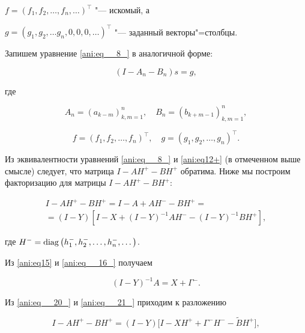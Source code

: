 $f=(f_{1} ,  f_{2} ,  \dots, f_{n} , \dots )^{\top} $ "--- искомый, а 

$g=(g_{1} ,  g_{2} ,  \dots g_{n} ,  0, 0,  0, \dots )^{\top} $ "--- заданный векторы"=столбцы.



Запишем уравнение \eqref{ani:eq__8_} в аналогичной форме:

\begin{equation}\label{ani:eq__19_}

\left({I} -A_{n} -B_{n} \right)s=g,

\end{equation}

где 

$$A_{n} =\left(a_{k-m} \right)_{k,m=1}^{n} ,\quad B_{n} =\left(b_{k+m-1} \right)_{k,m=1}^{n} ,$$ 

$$f=\left(f_{1} , f_{2} , \dots, f_{n} \right)^{\top} ,\quad  

g= (g_{1} ,  g_{2} ,  \dots, g_{n} )^{\top} .$$ 

Из эквивалентности уравнений \eqref{ani:eq__8_} и \eqref{ani:eq12+} (в отмеченном выше смысле) следует, что матрица $I-AH^{+} -BH^{+} $ обратима. Ниже мы построим факторизацию для матрицы $I-AH^{+} -BH^{+} $:

\begin{multline}

\label{ani:eq__20_}

I-AH^{+} -BH^{+} =I-A+AH^{-} -BH^{+} = \\

= (I-Y)  \left[I-X+ (I-Y) ^{-1} A  H^{-} - (I-Y) ^{-1} BH^{+} \right],

\end{multline}

где $H^{-} =\mathop{\rm diag}\left(h_{1}^{-} ,  h_{2}^{-} ,\dots , h_{n}^{-} , \dots \right)$. 

Из \eqref{ani:eq15} и \eqref{ani:eq__16_} получаем

\begin{equation}\label{ani:eq__21_}

 (I-Y) ^{-1} A=X+\Gamma ^{-} .

\end{equation}

Из \eqref{ani:eq__20_} и \eqref{ani:eq__21_}  приходим к разложению

\begin{equation}\label{ani:eq__22_}

I-AH^{+} -BH^{+} = (I-Y)  \bigl[I-XH^{+} +\Gamma ^{-} H^{-} -\tilde{B}H^{+} \bigr],

\end{equation}

